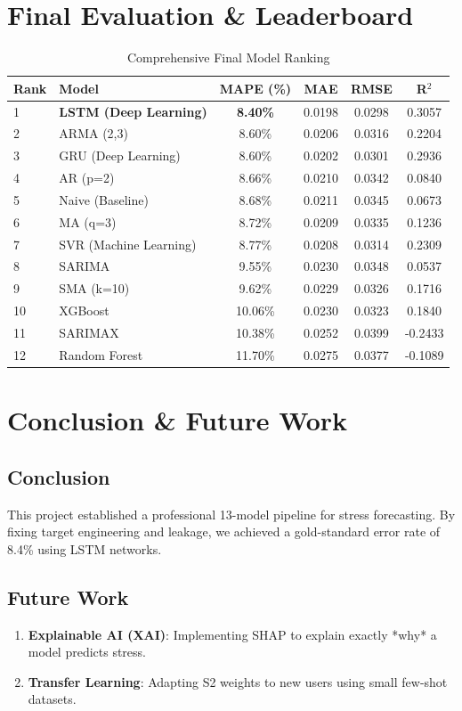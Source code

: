 \documentclass[12pt,a4paper,oneside]{report}
\begin{document}
\chapter{Final Evaluation & Leaderboard}
\begin{center}
\begin{longtable}{llcccc}
    \caption{Comprehensive Final Model Ranking} \\
    \toprule
    \textbf{Rank} & \textbf{Model} & \textbf{MAPE (\%)} & \textbf{MAE} & \textbf{RMSE} & \textbf{R$^2$} \\
    \midrule
    1 & \textbf{LSTM (Deep Learning)} & \textbf{8.40\%} & 0.0198 & 0.0298 & 0.3057 \\
    2 & ARMA (2,3) & 8.60\% & 0.0206 & 0.0316 & 0.2204 \\
    3 & GRU (Deep Learning) & 8.60\% & 0.0202 & 0.0301 & 0.2936 \\
    4 & AR (p=2) & 8.66\% & 0.0210 & 0.0342 & 0.0840 \\
    5 & Naive (Baseline) & 8.68\% & 0.0211 & 0.0345 & 0.0673 \\
    6 & MA (q=3) & 8.72\% & 0.0209 & 0.0335 & 0.1236 \\
    7 & SVR (Machine Learning) & 8.77\% & 0.0208 & 0.0314 & 0.2309 \\
    8 & SARIMA & 9.55\% & 0.0230 & 0.0348 & 0.0537 \\
    9 & SMA (k=10) & 9.62\% & 0.0229 & 0.0326 & 0.1716 \\
    10 & XGBoost & 10.06\% & 0.0230 & 0.0323 & 0.1840 \\
    11 & SARIMAX & 10.38\% & 0.0252 & 0.0399 & -0.2433 \\
    12 & Random Forest & 11.70\% & 0.0275 & 0.0377 & -0.1089 \\
    \bottomrule
\end{longtable}
\end{center}

\chapter{Conclusion & Future Work}
\section{Conclusion}
This project established a professional 13-model pipeline for stress forecasting. By fixing target engineering and leakage, we achieved a gold-standard error rate of 8.4\% using LSTM networks.

\section{Future Work}
\begin{enumerate}
    \item \textbf{Explainable AI (XAI)}: Implementing SHAP to explain exactly *why* a model predicts stress.
    \item \textbf{Transfer Learning}: Adapting S2 weights to new users using small few-shot datasets.
\end{enumerate}
\end{document}

